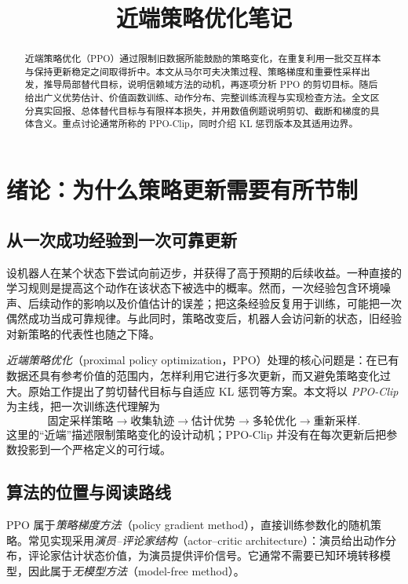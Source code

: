 \documentclass[UTF8,12pt,a4paper,fontset=fandol]{ctexart}
\title{近端策略优化笔记}
\author{}
\date{}
\begin{document}
\maketitle

\begin{abstract}
近端策略优化（PPO）通过限制旧数据所能鼓励的策略变化，在重复利用一批交互样本与保持更新稳定之间取得折中。本文从马尔可夫决策过程、策略梯度和重要性采样出发，推导局部替代目标，说明信赖域方法的动机，再逐项分析 PPO 的剪切目标。随后给出广义优势估计、价值函数训练、动作分布、完整训练流程与实现检查方法。全文区分真实回报、总体替代目标与有限样本损失，并用数值例题说明剪切、截断和梯度的具体含义。重点讨论通常所称的 PPO-Clip，同时介绍 KL 惩罚版本及其适用边界。
\end{abstract}

\tableofcontents

\section{绪论：为什么策略更新需要有所节制}
\label{sec:ppo-introduction}

\subsection{从一次成功经验到一次可靠更新}

设机器人在某个状态下尝试向前迈步，并获得了高于预期的后续收益。一种直接的学习规则是提高这个动作在该状态下被选中的概率。然而，一次经验包含环境噪声、后续动作的影响以及价值估计的误差；把这条经验反复用于训练，可能把一次偶然成功当成可靠规律。与此同时，策略改变后，机器人会访问新的状态，旧经验对新策略的代表性也随之下降。

\emph{近端策略优化}（proximal policy optimization，PPO）处理的核心问题是：在已有数据还具有参考价值的范围内，怎样利用它进行多次更新，而又避免策略变化过大。原始工作提出了剪切替代目标与自适应 KL 惩罚等方案\cite{schulman-ppo}。本文将以 \emph{PPO-Clip} 为主线，把一次训练迭代理解为
\[
  \text{固定采样策略}
  \longrightarrow \text{收集轨迹}
  \longrightarrow \text{估计优势}
  \longrightarrow \text{多轮优化}
  \longrightarrow \text{重新采样}.
\]
这里的“近端”描述限制策略变化的设计动机；PPO-Clip 并没有在每次更新后把参数投影到一个严格定义的可行域。

\subsection{算法的位置与阅读路线}

PPO 属于\emph{策略梯度方法}（policy gradient method），直接训练参数化的随机策略。常见实现采用\emph{演员--评论家结构}（actor--critic architecture）：演员给出动作分布，评论家估计状态价值，为演员提供评价信号。它通常不需要已知环境转移模型，因此属于\emph{无模型方法}（model-free method）。
\end{document}
